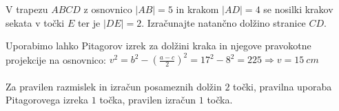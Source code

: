 \documentclass[addpoints]{exam}
\begin{document}
\begin{questions}






    \newpage

    \question[3]
        V trapezu $ABCD$ z osnovnico $|AB|=5$ in krakom $|AD|=4$ se nosilki krakov sekata v točki $E$ ter je $|DE|=2$.
        Izračunajte natančno dolžino stranice $CD$.


    \begin{solution}[11cm]
        Uporabimo lahko Pitagorov izrek za dolžini kraka in njegove pravokotne projekcije na osnovnico: $v^2=b^2-\left(\frac{a-c}{2}\right)^2=17^2-8^2=225 \Rightarrow v=15~cm$ \\ \\
        Za pravilen razmislek in izračun posameznih dolžin $2$ točki, pravilna uporaba Pitagorovega izreka $1$ točka, pravilen izračun $1$ točka.
    \end{solution}





\end{questions}
\end{document}
